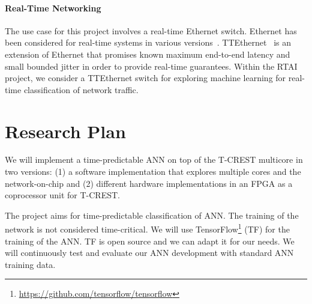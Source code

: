 \documentclass[fleqn,12pt]{article}
\begin{document}
\paragraph{Real-Time Networking}

The use case for this project involves a real-time Ethernet switch. Ethernet has been
considered for real-time systems in various versions~\cite{rtethernet:2005}.
TTEthernet~\cite{noc:tte} is an extension of Ethernet that promises known maximum
end-to-end latency and small bounded jitter in order to provide real-time guarantees.
Within the RTAI project, we consider a TTEthernet switch for exploring machine learning
for real-time classification of network traffic.


%




\section{Research Plan}

We will implement a time-predictable ANN on top of the T-CREST multicore in two
versions: (1) a software implementation that explores multiple cores and
the network-on-chip and (2) different hardware implementations in an FPGA
as a coprocessor unit for T-CREST.

The project aims for time-predictable classification of ANN. The training
of the network is not considered time-critical.
We will use TensorFlow\footnote{\url{https://github.com/tensorflow/tensorflow}} (TF)
for the training of the ANN. TF is open source and we can adapt it for our needs.
We will continuously test and evaluate our ANN development with
standard ANN training data.

\end{document}
